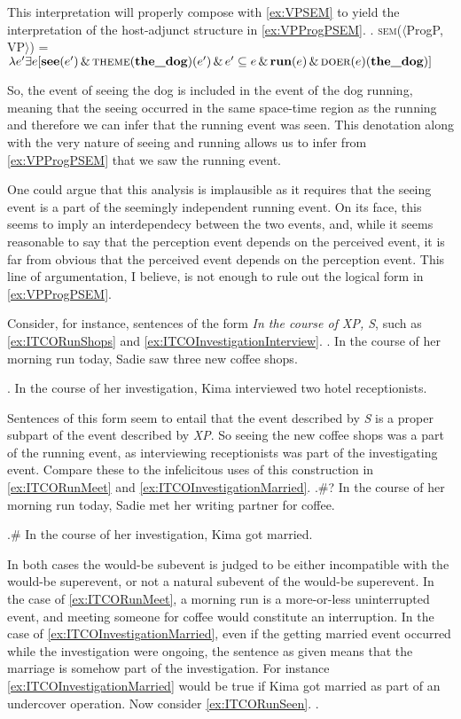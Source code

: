 \documentclass[MilwayThesis]{subfiles}
\begin{document}
This interpretation will properly compose with \cref{ex:VPSEM} to yield the interpretation of the host-adjunct structure in \cref{ex:VPProgPSEM}.
\ex.\label{ex:VPProgPSEM} \textsc{sem}($\langle$ProgP, VP$\rangle$) = $\lambda e^{\prime} \exists e [ \textbf{see}(e^{\prime})\,\&\,\textsc{theme}(\textbf{the\_dog})(e^{\prime})\,\&\,e^{\prime} \subseteq e\,\&\,\textbf{run}(e)\,\&\,\textsc{doer}(e)(\textbf{the\_dog})]$

So, the event of seeing the dog is included in the event of the dog running, meaning that the seeing occurred in the same space-time region as the running and therefore we can infer that the running event was seen.
This denotation along with the very nature of seeing and running allows us to infer from \cref{ex:VPProgPSEM} that we saw the running event.

One could argue that this analysis is implausible as it requires that the seeing event is a part of the seemingly independent running event.
On its face, this seems to imply an interdependecy between the two events, and, while it seems reasonable to say that the perception event depends on the perceived event, it is far from obvious that the perceived event depends on the perception event.
This line of argumentation, I believe, is not enough to rule out the logical form in \cref{ex:VPProgPSEM}.

Consider, for instance, sentences of the form \textit{In the course of XP, S}, such as \cref{ex:ITCORunShops} and \cref{ex:ITCOInvestigationInterview}.
\ex.\label{ex:ITCORunShops} In the course of her morning run today, Sadie saw three new coffee shops.

\ex.\label{ex:ITCOInvestigationInterview} In the course of her investigation, Kima interviewed two hotel receptionists.

Sentences of this form seem to entail that the event described by \textit{S} is a proper subpart of the event described by \textit{XP}.
So seeing the new coffee shops was a part of the running event, as interviewing receptionists was part of the investigating event.
Compare these to the infelicitous uses of this construction in \cref{ex:ITCORunMeet} and \cref{ex:ITCOInvestigationMarried}.
\ex.\#? In the course of her morning run today, Sadie met her writing partner for coffee.\label{ex:ITCORunMeet}

\ex.\# In the course of her investigation, Kima got married.\label{ex:ITCOInvestigationMarried}

In both cases the would-be subevent is judged to be either incompatible with the would-be superevent, or not a natural subevent of the would-be superevent.
In the case of \cref{ex:ITCORunMeet}, a morning run is a more-or-less uninterrupted event, and meeting someone for coffee would constitute an interruption.
In the case of \cref{ex:ITCOInvestigationMarried}, even if the getting married event occurred while the investigation were ongoing, the sentence as given means that the marriage is somehow part of the investigation.
For instance \cref{ex:ITCOInvestigationMarried} would be true if Kima got married as part of an undercover operation.
Now consider \cref{ex:ITCORunSeen}.
\ex.\label{ex:ITCORunSeen}
\end{document}
